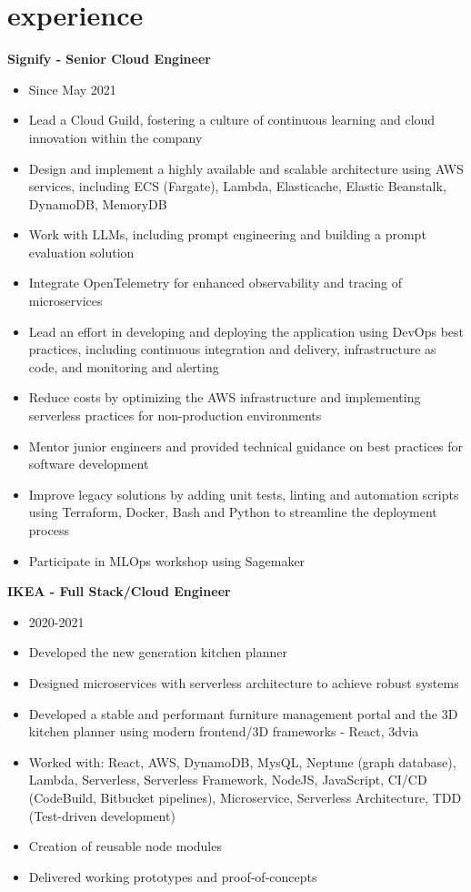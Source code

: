 \documentclass[]{friggeri-cv}
\begin{document}
\section{experience}

\textbf{Signify - Senior Cloud Engineer}
\begin{itemize}
  \item Since May 2021
  \item Lead a Cloud Guild, fostering a culture of continuous learning and cloud innovation within the company
  \item Design and implement a highly available and scalable architecture using AWS services, including ECS (Fargate), Lambda, Elasticache, Elastic Beanstalk, DynamoDB, MemoryDB
  \item Work with LLMs, including prompt engineering and building a prompt evaluation solution
  \item Integrate OpenTelemetry for enhanced observability and tracing of microservices
  \item Lead an effort in developing and deploying the application using DevOps best practices, including continuous integration and delivery, infrastructure as code, and monitoring and alerting
  \item Reduce costs by optimizing the AWS infrastructure and implementing serverless practices for non-production environments
  \item Mentor junior engineers and provided technical guidance on best practices for software development
  \item Improve legacy solutions by adding unit tests, linting and automation scripts using Terraform, Docker, Bash and Python to streamline the deployment process
  \item Participate in MLOps workshop using Sagemaker
\end{itemize}

\textbf{IKEA - Full Stack/Cloud Engineer}
\begin{itemize}
  \item 2020-2021
  \item Developed the new generation kitchen planner
  \item Designed microservices with serverless architecture to achieve robust systems
  \item Developed a stable and performant furniture management portal and the 3D kitchen planner using modern frontend/3D frameworks - React, 3dvia
  \item Worked with: React, AWS, DynamoDB, MysQL, Neptune (graph database), Lambda, Serverless, Serverless Framework, NodeJS, JavaScript, CI/CD (CodeBuild, Bitbucket pipelines), Microservice, Serverless Architecture, TDD (Test-driven development)
  \item Creation of reusable node modules
  \item Delivered working prototypes and proof-of-concepts
\end{itemize}
\end{document}
